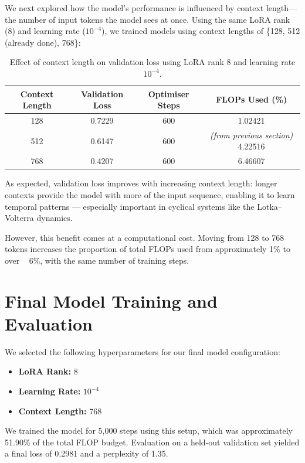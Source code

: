 \documentclass[a4paper,12pt]{article}
\begin{document}
We next explored how the model’s performance is influenced by context length—the number of input tokens the model sees at once. Using the same LoRA rank (8) and learning rate ($10^{-4}$), we trained models using context lengths of \{128, 512 (already done), 768\}:

\begin{table}[H]
  \centering
  \begin{tabular}{|c|c|c|c|}
    \hline
    \textbf{Context Length} & \textbf{Validation Loss} & \textbf{Optimiser Steps} & \textbf{FLOPs Used (\%)} \\
    \hline
    128 & 0.7229 & 600 & 1.02421 \\
    512 & 0.6147 & 600 & \textit{(from previous section)} 4.22516 \\
    768 & 0.4207 & 600 & 6.46607 \\
    \hline
  \end{tabular}
  \vspace{0.2cm}
  \caption{Effect of context length on validation loss using LoRA rank 8 and learning rate $10^{-4}$.}
  \label{tab:context_length_results}
\end{table}

As expected, validation loss improves with increasing context length: longer contexts provide the model with more of the input sequence, enabling it to learn temporal patterns — especially important in cyclical systems like the Lotka–Volterra dynamics.

However, this benefit comes at a computational cost. Moving from 128 to 768 tokens increases the proportion of total FLOPs used from approximately 1\% to over ~ 6\%, with the same number of training steps.

\section{Final Model Training and Evaluation}

We selected the following hyperparameters for our final model configuration:
\begin{itemize}
    \item \textbf{LoRA Rank:} 8
    \item \textbf{Learning Rate:} $10^{-4}$
    \item \textbf{Context Length:} 768
\end{itemize}

We trained the model for 5,000 steps using this setup, which was approximately 51.90\% of the total FLOP budget. Evaluation on a held-out validation set yielded a final loss of 0.2981 and a perplexity of 1.35.
\end{document}
